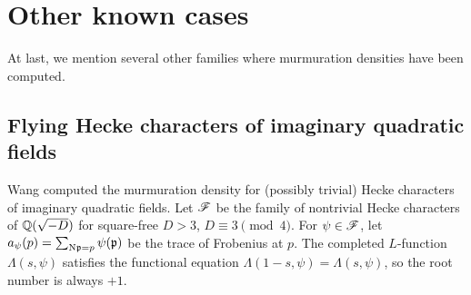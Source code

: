 \section{Other known cases}
\label{sec:other}

At last, we mention several other families where murmuration densities have been computed.

\subsection{Flying Hecke characters of imaginary quadratic fields}

Wang \cite{wang2025murmurations} computed the murmuration density for (possibly trivial) Hecke characters of imaginary quadratic fields.
Let $\mathscr{F}$ be the family of nontrivial Hecke characters of $\mathbb{Q}(\sqrt{-D})$ for square-free $D > 3$, $D \equiv 3 \pmod{4}$.
For $\psi \in \mathscr{F}$, let $a_\psi(p) = \sum_{\mathrm{N}\mathfrak{p} = p} \psi(\mathfrak{p})$ be the trace of Frobenius at $p$.
The completed $L$-function $\Lambda(s, \psi)$ satisfies the functional equation $\Lambda(1 - s, \psi) = \Lambda(s, \psi)$, so the root number is always $+1$.

